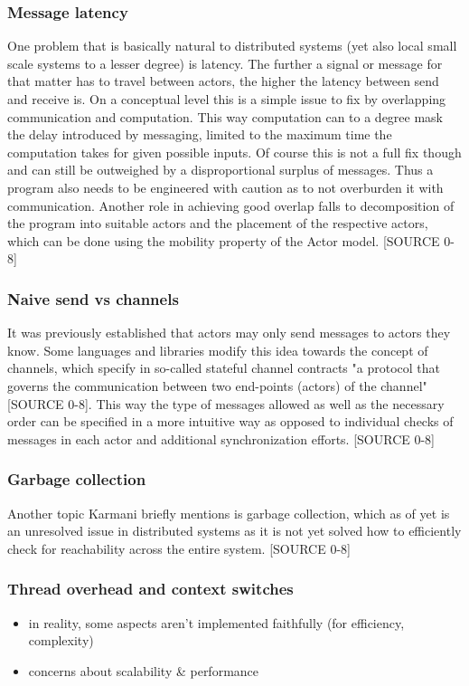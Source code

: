 \documentclass[A4]{article}
\begin{document}
\subsubsection{Message latency}
One problem that is basically natural to distributed systems (yet also local small scale systems to a lesser degree) is latency. The further a signal or message for that matter has to travel between actors, the higher the latency between send and receive is. 
On a conceptual level this is a simple issue to fix by overlapping communication and computation. This way computation can to a degree mask the delay introduced by messaging, limited to the maximum time the computation takes for given possible inputs. Of course this is not a full fix though and can still be outweighed by a disproportional surplus of messages. Thus a program also needs to be engineered with caution as to not overburden it with communication. Another role in achieving good overlap falls to decomposition of the program into suitable actors and the placement of the respective actors, which can be done using the mobility property of the Actor model. [SOURCE 0-8]
\subsubsection{Naive send vs channels}
It was previously established that actors may only send messages to actors they know. Some languages and libraries modify this idea towards the concept of channels, which specify in so-called stateful channel contracts "a protocol that governs the communication between two end-points (actors) of the channel" [SOURCE 0-8]. This way the type of messages allowed as well as the necessary order can be specified in a more intuitive way as opposed to individual checks of messages in each actor and additional synchronization efforts. [SOURCE 0-8]
\subsubsection{Garbage collection}
Another topic Karmani briefly mentions is garbage collection, which as of yet is an unresolved issue in distributed systems as it is not yet solved how to efficiently check for reachability across the entire system. [SOURCE 0-8]
\subsubsection{Thread overhead and context switches}


\begin{itemize}
\item in reality, some aspects aren't implemented faithfully (for efficiency, complexity)
\item concerns about scalability \& performance
\end{itemize}
\end{document}
